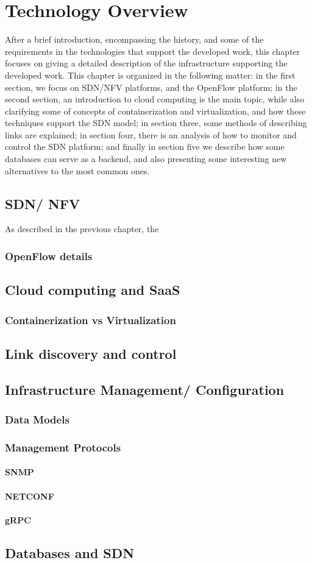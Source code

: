 \chapter{Technology Overview} \label{chap:tech} %
\hspace {5mm}

After a brief introduction, encompassing the history, and some of the requirements in the technologies that support the developed work, this chapter focuses on giving a detailed description of the infrastructure supporting 
the developed work. This chapter is organized in the following matter: in the first section, we focus on SDN/NFV platforms, and the OpenFlow platform; in the second section, an introduction to cloud computing is the main topic,
while also clarifying some of concepts of containerization and virtualization, and how these techniques support the SDN model; in section three, some methods of describing links are explained; in section four, there is an 
analysis of how to monitor and control the SDN platform; and finally in section five we describe how some databases can serve as a backend, and also presenting some interesting new alternatives to the most common ones.

\section {SDN/ NFV}

As described in the previous chapter, the 
\subsection {OpenFlow details}
\section {Cloud computing and SaaS}
\subsection {Containerization vs Virtualization}
\section {Link discovery and control}
\section {Infrastructure Management/ Configuration}
\subsection {Data Models}
\subsection {Management Protocols}
\subsubsection {SNMP}
\subsubsection {NETCONF}
\subsubsection {gRPC}
\section {Databases and SDN} %

